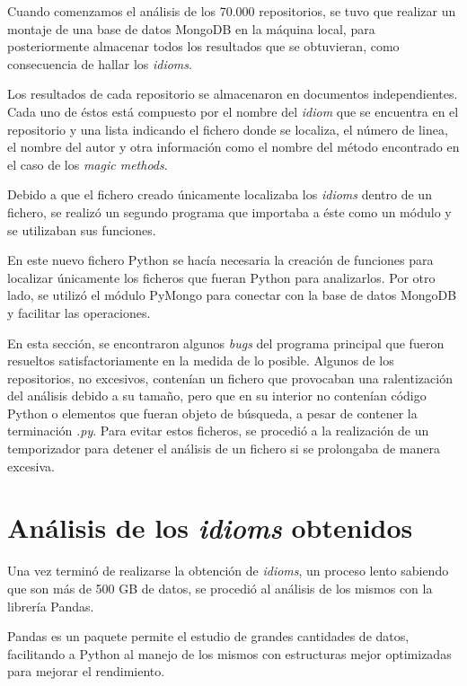 \documentclass[a4paper, 12pt]{book}
\begin{document}
Cuando comenzamos el análisis de los 70.000 repositorios, se tuvo que realizar un montaje de una base de datos MongoDB en la máquina local, para posteriormente almacenar todos los resultados que se obtuvieran, como consecuencia de hallar los \textit{idioms}.

Los resultados de cada repositorio se almacenaron en documentos independientes. Cada uno de éstos está compuesto por el nombre del \textit{idiom} que se encuentra en el repositorio y una lista indicando el fichero donde se localiza, el número de linea, el nombre del autor y otra información como el nombre del método encontrado en el caso de los \textit{magic methods}.

Debido a que el fichero creado únicamente localizaba los \textit{idioms} dentro de un fichero, se realizó un segundo programa que importaba a éste como un módulo y se utilizaban sus funciones.

En este nuevo fichero Python se hacía necesaria la creación de funciones para localizar únicamente los ficheros que fueran Python para analizarlos. Por otro lado, se utilizó el módulo PyMongo para conectar con la base de datos MongoDB y facilitar las operaciones.

En esta sección, se encontraron algunos \textit{bugs} del programa principal que fueron resueltos satisfactoriamente en la medida de lo posible. Algunos de los repositorios, no excesivos, contenían un fichero que provocaban una ralentización del análisis debido a su tamaño, pero que en su interior no contenían código Python o elementos que fueran objeto de búsqueda, a pesar de contener la terminación \textit{.py}. Para evitar estos ficheros, se procedió a la realización de un temporizador para detener el análisis de un fichero si se prolongaba de manera excesiva.



\section{Análisis de los \textit{idioms} obtenidos}
\label{sec:analyze_idioms}

Una vez terminó de realizarse la obtención de \textit{idioms}, un proceso lento sabiendo que son más de 500 GB de datos, se procedió al análisis de los mismos con la librería Pandas.

Pandas es un paquete permite el estudio de grandes cantidades de datos, facilitando a Python al manejo de los mismos con estructuras mejor optimizadas para mejorar el rendimiento.
\end{document}

